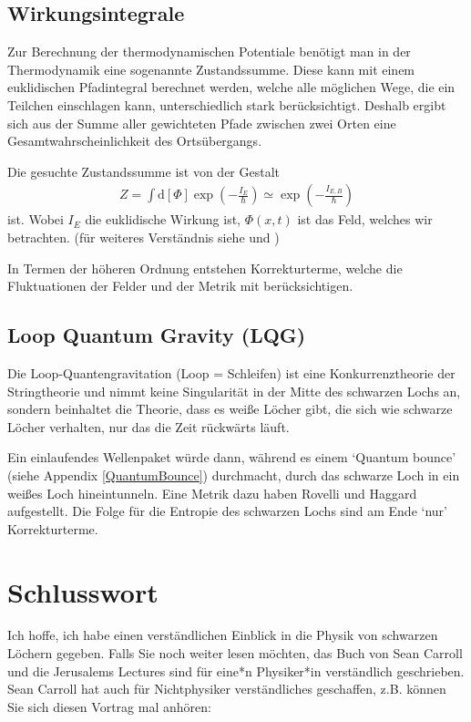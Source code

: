 \documentclass[ngerman]{scrartcl}
\newcommand{\diff}{\mathrm{d}}
\begin{document}
	\subsection{Wirkungsintegrale}
	Zur Berechnung der thermodynamischen Potentiale benötigt man in der Thermodynamik eine sogenannte Zustandssumme. Diese kann mit einem euklidischen Pfadintegral berechnet werden, welche alle möglichen Wege, die ein Teilchen einschlagen kann, unterschiedlich stark berücksichtigt. Deshalb ergibt sich aus der Summe aller gewichteten Pfade zwischen zwei Orten eine Gesamtwahrscheinlichkeit des Ortsübergangs.
	
	Die gesuchte Zustandssumme ist von der Gestalt 
		\begin{align}
			Z = \int \diff [\Phi] \exp \left(- \frac{I_E}{\hbar}\right) 
			\simeq \exp \left(- \frac{I_{E,B}}{\hbar}\right)
		\end{align}
	ist. Wobei $I_E$ die euklidische Wirkung ist, $\Phi(x,t)$ ist das Feld, welches wir betrachten. (für weiteres Verständnis siehe \cite{Gebhardt} und \cite{Pfadintegral})
	
	In Termen der höheren Ordnung entstehen Korrekturterme, welche die Fluktuationen der Felder und der  Metrik mit berücksichtigen.
	
	\subsection{Loop Quantum Gravity (LQG)}	%
Die Loop-Quantengravitation (Loop = Schleifen) ist eine Konkurrenztheorie der Stringtheorie und nimmt keine Singularität in der Mitte des schwarzen Lochs an, sondern beinhaltet die Theorie, dass es weiße Löcher gibt, die sich wie schwarze Löcher verhalten, nur das die Zeit rückwärts läuft. 

Ein einlaufendes Wellenpaket würde dann, während es einem `Quantum bounce' (siehe Appendix
\ref{QuantumBounce}) durchmacht, durch das schwarze Loch in ein weißes Loch hineintunneln. Eine Metrik dazu haben Rovelli und Haggard \cite{LQGRovelli} aufgestellt. Die Folge für die Entropie des schwarzen Lochs sind am Ende `nur' Korrekturterme.

\section{Schlusswort}
	Ich hoffe, ich habe einen verständlichen Einblick in die Physik von schwarzen Löchern gegeben. Falls Sie noch weiter lesen möchten, das Buch von Sean Carroll \cite{SeanCarroll} und die Jerusalems Lectures \cite{JerusalemsLectures} sind für eine*n Physiker*in verständlich geschrieben. Sean Carroll hat auch für Nichtphysiker verständliches geschaffen, z.B. können Sie sich diesen Vortrag mal anhören: \cite{SeanCarrollVortrag}
	
\end{document}
